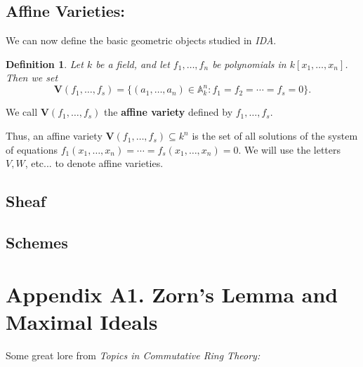 \documentclass[12pt,reqno]{amsart}
\theoremstyle{plain}
\newtheorem{defi}{Definition}
\newcommand{\aff}{\mathbb A}
\newcommand{\pring}{k[x_1, \ldots , x_n]}
\newcommand{\V}{\mathbf V}
\begin{document}
\subsection{Affine Varieties:} 

We can now define the basic geometric objects studied in \textit{IDA}.

\begin{defi} Let $k$ be a field, and let $f_1, \ldots, f_n$ be polynomials in $\pring$. Then we set $$\V (f_1, \ldots , f_s) = \{ (a_1, \ldots, a_n) \in \aff^n_k \colon f_1 = f_2 = \cdots = f_s = 0 \}.$$
\end{defi} 
We call $\V (f_1, \ldots, f_s)$ the \textbf{affine variety} defined by $f_1, \ldots, f_s$.

Thus, an affine variety $\V (f_1, \ldots, f_s) \subseteq k^n $ is the set of all solutions of the system of equations $f_1 (x_1, \ldots, x_n) = \cdots = f_s (x_1, \ldots, x_n ) = 0$. We will use the letters $V, W$, etc... to denote affine varieties.
\subsection{Sheaf}
\subsection{Schemes}
\newpage
\section{Appendix A1. Zorn’s Lemma and Maximal Ideals}

Some great lore from \textit{Topics in Commutative Ring Theory:}
\end{document}

